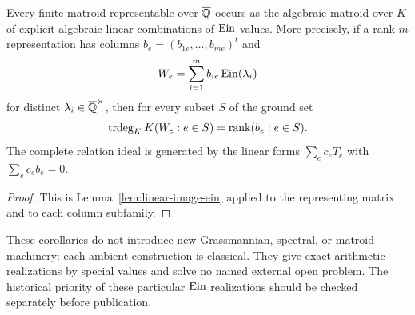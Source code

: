 \begin{corollary}
\label{cor:ein-representable-matroid}
Every finite matroid representable over $\overline{\mathbb Q}$ occurs as the algebraic
matroid over $K$ of explicit algebraic linear combinations of
$\operatorname{Ein}$-values.  More precisely, if a rank-$m$ representation has columns
$b_e=(b_{1e},\ldots,b_{me})^t$ and
\[
 W_e=\sum_{i=1}^m b_{ie}\operatorname{Ein}(\lambda_i)
\]
for distinct $\lambda_i\in\overline{\mathbb Q}^\times$, then for every subset $S$ of the
ground set
\[
 \operatorname{trdeg}_K K(W_e:e\in S)=\operatorname{rank}(b_e:e\in S).
\]
The complete relation ideal is generated by the linear forms
$\sum_e c_eT_e$ with $\sum_e c_eb_e=0$.
\end{corollary}

\begin{proof}
This is Lemma~\ref{lem:linear-image-ein} applied to the representing
matrix and to each column subfamily.
\end{proof}

These corollaries do not introduce new Grassmannian, spectral, or matroid
machinery: each ambient construction is classical.  They give exact
arithmetic realizations by special values and solve no named external open
problem.  The historical priority of these particular $\operatorname{Ein}$ realizations
should be checked separately before publication.
